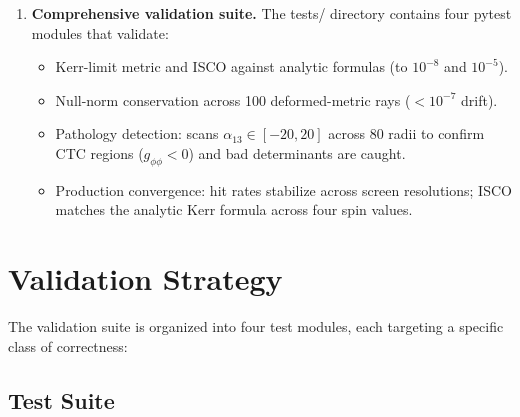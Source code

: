 \documentclass[11pt,twoside]{article}
\begin{document}
\begin{enumerate}[label=\textbf{\arabic*.}, leftmargin=1.5em]
\item \textbf{Comprehensive validation suite.} The tests/ directory contains
four pytest modules that validate:
\begin{itemize}
\item Kerr-limit metric and ISCO against analytic formulas (to $10^{-8}$ and $10^{-5}$).
\item Null-norm conservation across 100 deformed-metric rays ($< 10^{-7}$ drift).
\item Pathology detection: scans $\alpha_{13} \in [-20, 20]$ across 80 radii
to confirm CTC regions ($g_{\phi\phi} < 0$) and bad determinants are caught.
\item Production convergence: hit rates stabilize across screen resolutions;
ISCO matches the analytic Kerr formula across four spin values.
\end{itemize}
\end{enumerate}

\section{Validation Strategy}
\label{sec:validation}

The validation suite is organized into four test modules, each targeting a
specific class of correctness:

\subsection{Test Suite}
\end{document}
